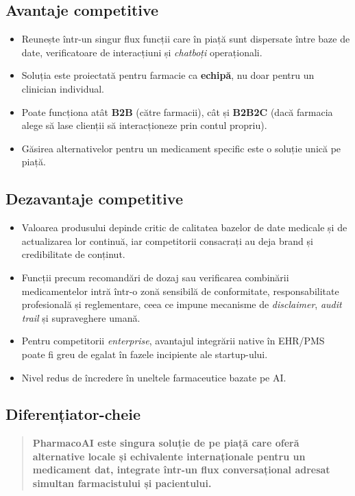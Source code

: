 \subsection{Avantaje competitive}
\begin{itemize}
    \item Reunește într-un singur flux funcții care în piață sunt dispersate între baze de date, verificatoare de interacțiuni și \textit{chatboți} operaționali.
    \item Soluția este proiectată pentru farmacie ca \textbf{echipă}, nu doar pentru un clinician individual.
    \item Poate funcționa atât \textbf{B2B} (către farmacii), cât și \textbf{B2B2C} (dacă farmacia alege să lase clienții să interacționeze prin contul propriu).
    \item Găsirea alternativelor pentru un medicament specific este o soluție unică pe piață.
\end{itemize}

\subsection{Dezavantaje competitive}
\begin{itemize}
    \item Valoarea produsului depinde critic de calitatea bazelor de date medicale și de actualizarea lor continuă, iar competitorii consacrați au deja brand și credibilitate de conținut.
    \item Funcții precum recomandări de dozaj sau verificarea combinării medicamentelor intră într-o zonă sensibilă de conformitate, responsabilitate profesională și reglementare, ceea ce impune mecanisme de \textit{disclaimer}, \textit{audit trail} și supraveghere umană.
    \item Pentru competitorii \textit{enterprise}, avantajul integrării native în EHR/PMS poate fi greu de egalat în fazele incipiente ale startup-ului.
    \item Nivel redus de încredere în uneltele farmaceutice bazate pe AI.
\end{itemize}

\subsection{Diferențiator-cheie}
\begin{quote}
\textbf{PharmacoAI este singura soluție de pe piață care oferă alternative locale și echivalente internaționale pentru un medicament dat, integrate într-un flux conversațional adresat simultan farmacistului și pacientului.}
\end{quote}
